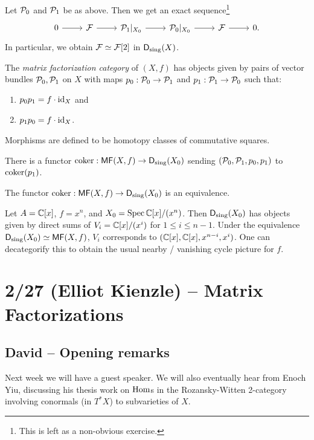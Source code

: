 \documentclass{article}
\begin{document}
Let $\mathcal{P}_0$ and $\mathcal{P}_1$ be as above.
Then we get an exact sequence\footnote{This is left as a non-obvious exercise.}
\[
	\begin{tikzcd}
		0 \rar & \Fc \rar & \Pc_1|_{X_0} \rar & \Pc_0|_{X_0} \rar & \Fc \rar & 0.
	\end{tikzcd}
\]
In particular, we obtain $\mathcal{F} \simeq \mathcal{F}[2]$ in $\mathsf{D}_{\mathrm{sing}}(X)$.

\begin{dfn}
	The \emph{matrix factorization category} of $(X, f)$ has objects given by pairs of vector bundles $\mathcal{P}_0, \mathcal{P}_1$ on $X$ with maps $p_0: \mathcal{P}_0 \to \mathcal{P}_1$ and $p_1: \mathcal{P}_1 \to \mathcal{P}_0$ such that:
	\begin{enumerate}
		\item $p_0 p_1 = f \cdot \operatorname{id}_X$ and 
		\item $p_1 p_0 = f \cdot \operatorname{id}_X$.
	\end{enumerate}
	Morphisms are defined to be homotopy classes of commutative squares.
\end{dfn}

There is a functor $\operatorname{coker}: \mathsf{MF}(X, f) \to \mathsf{D}_{\mathrm{sing}}(X_0)$ sending $(\mathcal{P}_0, \mathcal{P}_1, p_0, p_1)$ to $\operatorname{coker}(p_1)$.

\begin{thm}[Orlov]
	The functor $\operatorname{coker}: \mathsf{MF}(X, f) \to \mathsf{D}_{\mathrm{sing}}(X_0)$ is an equivalence.
\end{thm}

\begin{ex}
	Let $A = \mathbb{C}[x]$, $f = x^n$, and $X_0 = \operatorname{Spec} \mathbb{C}[x] / (x^n)$.
	Then $\mathsf{D}_{\mathrm{sing}}(X_0)$ has objects given by direct sums of $V_i = \mathbb{C}[x] / (x^i)$ for $1 \leq i \leq n-1$.
	Under the equivalence $\mathsf{D}_{\mathrm{sing}}(X_0) \simeq \mathsf{MF}(X, f)$, $V_i$ corresponds to $(\mathbb{C}[x], \mathbb{C}[x], x^{n-i}, x^i)$.
	One can decategorify this to obtain the usual nearby / vanishing cycle picture for $f$.
\end{ex}

\section{2/27 (Elliot Kienzle) -- Matrix Factorizations}

\subsection{David -- Opening remarks}

Next week we will have a guest speaker.
We will also eventually hear from Enoch Yiu, discussing his thesis work on $\operatorname{Hom}$s in the Rozansky-Witten 2-category involving conormals (in $T^*X$) to subvarieties of $X$.
\end{document}
